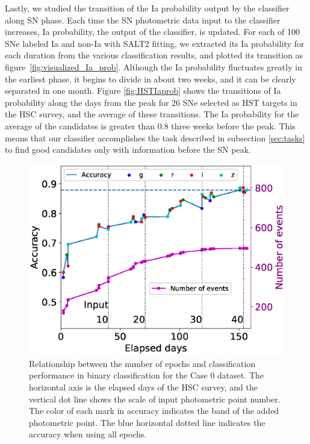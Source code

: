 \documentclass[useamsfonts]{pasj01}
\begin{document}
Lastly, we studied the transition of the Ia probability output by the classifier along SN phase.
Each time the SN photometric data input to the classifier increases, Ia probability, the output of the classifier, is updated.
For each of 100 SNe labeled Ia and non-Ia with SALT2 fitting, we extracted its Ia probability for each duration from the various classification results, and plotted its transition as figure\ \ref{fig:visualized_Ia_prob}.
Although the Ia probability fluctuates greatly in the earliest phase, it begins to divide in about two weeks, and it can be clearly separated in one month.
Figure \ref{fig:HSTIaprob} shows the transitions of Ia probability along the days from the peak for 26 SNe selected as HST targets in the HSC survey, and the average of these transitions.
The Ia probability for the average of the candidates is greater than 0.8 three weeks before the peak.
This means that our classifier accomplishes the task described in subsection \ref{sec:tasks} to find good candidates only with information before the SN peak.
%
\begin{figure}[htbp]
  \begin{center}
     \includegraphics[width=\columnwidth]{figures/n_observations_v2_case0.eps}
  \end{center}
  \caption{%
  Relationship between the number of epochs and classification performance in binary classification for the Case 0 dataset. 
  The horizontal axis is the elapsed days of the HSC survey, and the vertical dot line shows the scale of input photometric point number. 
  The color of each mark in accuracy indicates the band of the added photometric point. 
  The blue horizontal dotted line indicates the accuracy when using all epochs.
  }%
  \label{fig:n_observations}
\end{figure}
\end{document}
